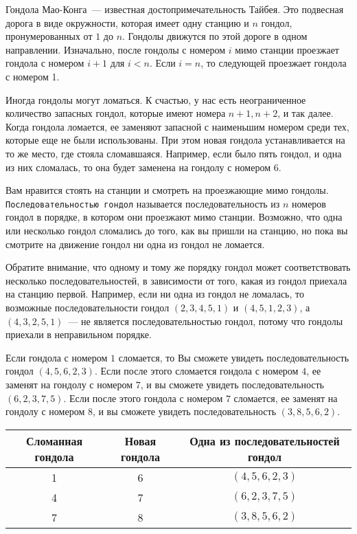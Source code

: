 Гондола Мао-Конга~--- известная достопримечательность Тайбея. Это подвесная дорога в
виде окружности, которая имеет одну станцию и $n$ гондол, пронумерованных от $1$ до $n$.
Гондолы движутся по этой дороге в одном направлении. Изначально, после гондолы с номером $i$ мимо станции проезжает гондола с номером $i + 1$ для $i < n$. Если $i = n$, то следующей проезжает гондола с номером 1.

Иногда гондолы могут ломаться. К счастью, у нас есть неограниченное количество запасных
гондол, которые имеют номера $n + 1, n + 2$, и так далее. Когда гондола ломается, ее
заменяют запасной с наименьшим номером среди тех, которые еще не были использованы.
При этом новая гондола устанавливается на то же место, где стояла сломавшаяся. Например,
если было пять гондол, и одна из них сломалась, то она будет заменена на гондолу с
номером 6.

Вам нравится стоять на станции и смотреть на проезжающие мимо гондолы. \texttt{Последовательностью гондол} называется последовательность из $n$ номеров гондол в
порядке, в котором они проезжают мимо станции. Возможно, что одна или несколько гондол
сломались до того, как вы пришли на станцию, но пока вы смотрите на движение гондол ни
одна из гондол не ломается.

Обратите внимание, что одному и тому же порядку гондол может соответствовать несколько
последовательностей, в зависимости от того, какая из гондол приехала на станцию первой.
Например, если ни одна из гондол не ломалась, то возможные последовательности гондол
$(2, 3, 4, 5, 1)$ и $(4, 5, 1, 2, 3)$, а $(4, 3, 2, 5, 1)$~--- не является последовательностью гондол, потому что гондолы приехали в неправильном порядке.

Если гондола с номером $1$ сломается, то Вы сможете увидеть последовательность гондол
$(4, 5, 6, 2, 3)$. Если после этого сломается гондола с номером $4$, ее заменят на гондолу с номером $7$, и вы сможете увидеть последовательность $(6, 2, 3, 7, 5)$. Если после этого гондола с номером $7$ сломается, ее заменят на гондолу с номером $8$, и вы сможете увидеть
последовательность $(3, 8, 5, 6, 2)$.

\begin{center}
\renewcommand{\arraystretch}{1.5}
\begin{tabular}{|c|c|c|}
\hline
Сломанная гондола & Новая гондола & Одна из последовательностей гондол \\
\hline
1 &  6 & $(4, 5, 6, 2, 3)$ \\
\hline
4 & 7 & $(6, 2, 3, 7, 5)$ \\
\hline
7 & 8 & $(3, 8, 5, 6, 2)$ \\
\hline
\end{tabular}
\end{center}

